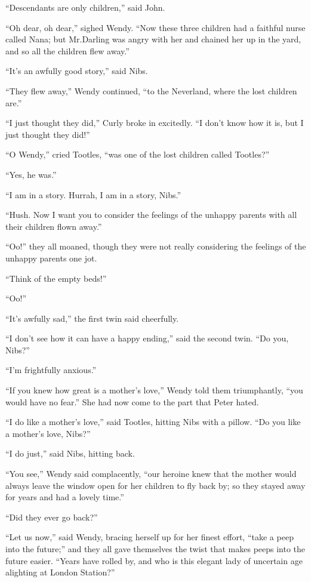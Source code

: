 “Descendants are only children,” said John.

“Oh dear, oh dear,” sighed Wendy.
“Now these three children had a faithful nurse called Nana;
but Mr.\@ Darling was angry with her and chained her up in the yard,
and so all the children flew away.”

“It’s an awfully good story,” said Nibs.

“They flew away,” Wendy continued, “to the Neverland,
where the lost children are.”

“I just thought they did,” Curly broke in excitedly.
“I don’t know how it is, but I just thought they did!”

“O Wendy,” cried Tootles, “was one of the lost children called Tootles?”

“Yes, he was.”

“I am in a story.
Hurrah, I am in a story, Nibs.”

“Hush.
Now I want you to consider the feelings of the unhappy parents with all their children flown away.”

“Oo!\@” they all moaned,
though they were not really considering the feelings of the unhappy parents one jot.

“Think of the empty beds!”

“Oo!”

“It’s awfully sad,” the first twin said cheerfully.

“I don’t see how it can have a happy ending,” said the second twin.
“Do you, Nibs?”

“I’m frightfully anxious.”

“If you knew how great is a mother’s love,” Wendy told them triumphantly,
“you would have no fear.”
She had now come to the part that Peter hated.

“I do like a mother’s love,” said Tootles, hitting Nibs with a pillow.
“Do you like a mother’s love, Nibs?”

“I do just,” said Nibs, hitting back.

“You see,” Wendy said complacently,
“our heroine knew that the mother would always leave the window open for her children to fly back by;
so they stayed away for years and had a lovely time.”

“Did they ever go back?”

“Let us now,” said Wendy, bracing herself up for her finest effort, “take a peep into the future;”
and they all gave themselves the twist that makes peeps into the future easier.
“Years have rolled by, and who is this elegant lady of uncertain age alighting at London Station?”

